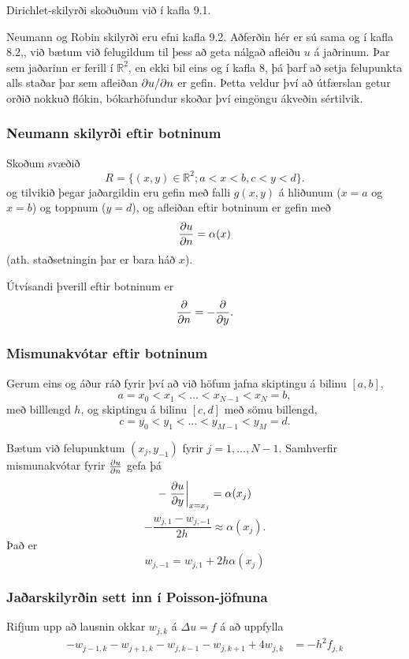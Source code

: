 \documentclass[icelandic,a4paper,12pt]{article}
\newcommand{\R}{{\mathbb  R}}
\begin{document}
 Dirichlet-skilyrði skoðuðum við í kafla 9.1. \pause
 
 Neumann og Robin skilyrði eru efni kafla 9.2. \pause
 Aðferðin hér er sú sama og í kafla 8.2,, við bætum við felugildum
 til þess að geta nálgað afleiðu $u$ á jaðrinum. \pause
 Þar sem jaðarinn er ferill í $\R^2$, en ekki bil eins og í kafla 8, 
 þá þarf að setja felupunkta alls staðar þar sem afleiðan ${\partial} u/{\partial} n$ er gefin. \pause
 Þetta veldur því að útfærslan getur orðið nokkuð flókin, 
 bókarhöfundur skoðar því eingöngu ákveðin sértilvik. 





\subsubsection{Neumann skilyrði eftir botninum}

 Skoðum svæðið 
  $$
    R = \{ (x,y) \in \R^2 ; a < x < b, c < y < d \}.
  $$ \pause
 og tilvikið þegar jaðargildin eru gefin með falli $g(x,y)$
 á hliðunum ($x=a$ og $x=b$) og toppnum ($y=d$), og 
 afleiðan eftir botninum er gefin með 
 $$
  \frac{{\partial} u}{{\partial} n} = \alpha(x)
 $$
 (ath. staðsetningin þar er bara háð $x$).
 
 Útvísandi þverill eftir botninum er 
 $$
 \frac{{\partial} }{{\partial} n} = -\frac{{\partial} }{{\partial} y}.
 $$
 



\subsubsection{Mismunakvótar eftir botninum}
 Gerum eins og áður ráð fyrir því að við höfum jafna skiptingu á bilinu $[a,b]$,
 $$
  a = x_0 < x_1 < \ldots < x_{N-1} < x_N = b,
 $$
 með billlengd $h$, \pause og skiptingu á bilinu $[c,d]$ með sömu billengd,
 $$
  c = y_0 < y_1 < \ldots < y_{M-1} < y_M = d.
 $$
 \pause
 
 Bætum við felupunktum $(x_j,y_{-1})$ fyrir $j=1,\ldots,N-1$. \pause
 Samhverfir mismunakvótar fyrir $\frac{{\partial} u}{{\partial} n}$ gefa þá
 $$
  - \left. \frac{{\partial} u}{{\partial} y} \right|_{x=x_j} = \alpha(x_j) 
 $$
 $$
  -\frac{w_{j,1} - w_{j,-1} }{2h} \approx \alpha(x_j).
  $$
  Það er 
  $$
    w_{j,-1}  = w_{j,1} + 2h\alpha(x_j)
  $$


\subsubsection{Jaðarskilyrðin sett inn í Poisson-jöfnuna}
 Rifjum upp að lausnin  okkar $w_{j,k}$ á $\Delta u = f$ á að uppfylla
 \begin{align*}
 -w_{j-1,k} - w_{j+1,k} - w_{j,k-1} - w_{j,k+1} + 4w_{j,k} &= -h^2 f_{j,k} 
 \end{align*}
 
\end{document}
